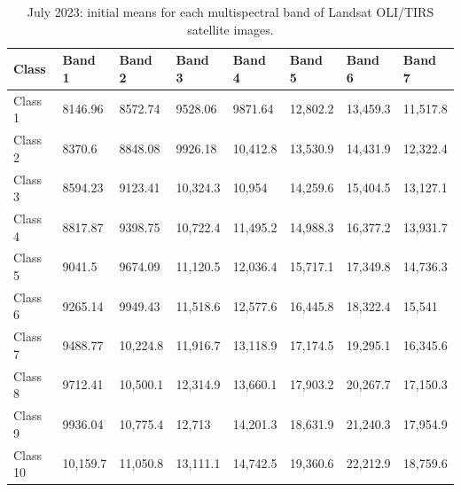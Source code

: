 \documentclass[geomatics,article,accept,pdftex,oneauthor]{Definitions/mdpi}
\begin{document}
\begin{table}[H]
\caption{July 2023: initial means for each multispectral band of Landsat OLI/TIRS satellite images.}\label{tabA04}
\begin{tabularx}{\textwidth}{ p{1.5cm} X X X X X X X }
\toprule \textbf{Class} & \textbf{Band 1} & \textbf{Band 2} & \textbf{Band 3} & \textbf{Band 4} & \textbf{Band 5} & \textbf{Band 6} & \textbf{Band 7} \\  \midrule
    Class 1 & 8146.96 & 8572.74 & 9528.06 & 9871.64 & 12,802.2 & 13,459.3 & 11,517.8 \\
    Class 2 & 8370.6 & 8848.08 & 9926.18 & 10,412.8 & 13,530.9 & 14,431.9 & 12,322.4 \\
    Class 3 & 8594.23 & 9123.41 & 10,324.3 & 10,954 & 14,259.6 & 15,404.5 & 13,127.1 \\
    Class 4 & 8817.87 & 9398.75 & 10,722.4 & 11,495.2 & 14,988.3 & 16,377.2 & 13,931.7 \\
    Class 5 & 9041.5 & 9674.09 & 11,120.5 & 12,036.4 & 15,717.1 & 17,349.8 & 14,736.3 \\
    Class 6 & 9265.14 & 9949.43 & 11,518.6 & 12,577.6 & 16,445.8 & 18,322.4 & 15,541 \\
    Class 7 & 9488.77 & 10,224.8 & 11,916.7 & 13,118.9 & 17,174.5 & 19,295.1 & 16,345.6 \\
    Class 8 & 9712.41 & 10,500.1 & 12,314.9 & 13,660.1 & 17,903.2 & 20,267.7 & 17,150.3 \\
    Class 9 & 9936.04 & 10,775.4 & 12,713 & 14,201.3 & 18,631.9 & 21,240.3 & 17,954.9 \\
    Class 10 & 10,159.7 & 11,050.8 & 13,111.1 & 14,742.5 & 19,360.6 & 22,212.9 & 18,759.6 \\
    \bottomrule
\end{tabularx}
\label{tabA04}
\end{table}
\vspace{-6pt}
\end{document}
